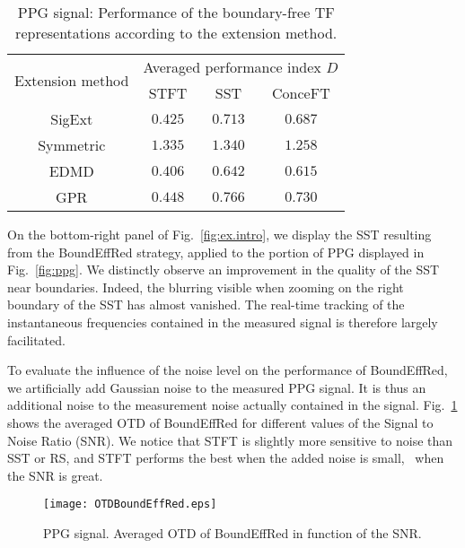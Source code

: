 \begin{table}
\centering
\caption{PPG signal: Performance of the boundary-free TF representations according to the extension method.}
\begin{tabular}{|c||c|c|c|}
  \hline
   \multirow{2}{40pt}{\centering Extension method} & \multicolumn{3}{c|}{Averaged performance index $D$} \\
   \cline{2-4}
      & STFT & SST & ConceFT\\
   \hhline{|=#=|=|=|}
   {\sf SigExt} & $0.425$ & $0.713$ & $0.687$ \\
   \hline
   Symmetric & $1.335$ & $1.340$ & $1.258$ \\
   \hline
   EDMD & $0.406$ & $0.642$ & $0.615$ \\
   \hline
   GPR & $0.448$ & $0.766$ & $0.730$ \\
   \hline
\end{tabular}
\label{tab:otd.ppg}
\end{table}

On the bottom-right panel of Fig.~\ref{fig:ex.intro}, we display the SST resulting from the {\sf BoundEffRed} strategy, applied to the portion of PPG displayed in Fig.~\ref{fig:ppg}. We distinctly observe an improvement in the quality of the SST near boundaries. Indeed, the blurring visible when zooming on the right boundary of the SST has almost vanished. The real-time tracking of the instantaneous frequencies contained in the measured signal is therefore largely facilitated.



To evaluate the influence of the noise level on the performance of {\sf BoundEffRed}, we artificially add Gaussian noise to the measured PPG signal. It is thus an additional noise to the measurement noise actually contained in the signal. Fig.~\ref{fig:otd.noise} shows the averaged OTD of {\sf BoundEffRed} for different values of the Signal to Noise Ratio (SNR). We notice that STFT is slightly more sensitive to noise than SST or RS, and STFT performs the best when the added noise is small, \ie~when the SNR is great.


\begin{figure}
\centering
\texttt{[image: OTDBoundEffRed.eps]}
\caption{PPG signal. Averaged OTD of {\sf BoundEffRed} in function of the SNR.}
\label{fig:otd.noise}
\end{figure} 